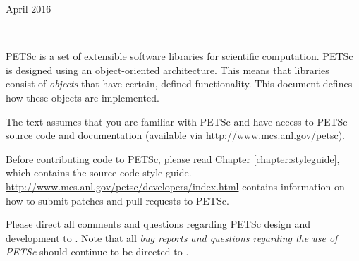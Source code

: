 %
%



\pagestyle{fancy}

\makeindex



{}{April 2016}

\newpage

\hbox{ }

\vspace{1in}
\date{\today}

\pagestyle{empty}
\newpage

\medskip \medskip

%
%

\medskip \medskip
PETSc is
a set of extensible software libraries for scientific computation.
PETSc is designed using an object-oriented
architecture. This means that libraries consist of {\em objects} that
have certain, defined functionality. This document defines how these
objects are implemented.

The text assumes
that you are familiar with PETSc and have access to PETSc source code and documentation
(available via \href{http://www.mcs.anl.gov/petsc}{http://www.mcs.anl.gov/petsc}).

Before contributing code to PETSc, please read Chapter \ref{chapter:styleguide}, which contains the source code style guide.
\href{http://www.mcs.anl.gov/petsc/developers/index.html}{http://www.mcs.anl.gov/petsc/developers/index.html}
contains information on how to submit patches and pull requests to PETSc.

\vspace{1cm}

Please direct all comments and questions regarding PETSc design and
development to .  Note that all {\em
bug reports and questions regarding the use of PETSc} should continue
to be directed to .

%
%

